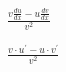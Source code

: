 \documentclass[12pt]{article}
\begin{document}
 {\LARGE{$\frac{v\frac{du}{dx}-u\frac{dv}{dx}}{v^{2}}$}}
 
 
 {\LARGE{$\frac{v \cdot u^{\prime} - u \cdot v^{\prime}}{v^{2}}$}}
\end{document}
